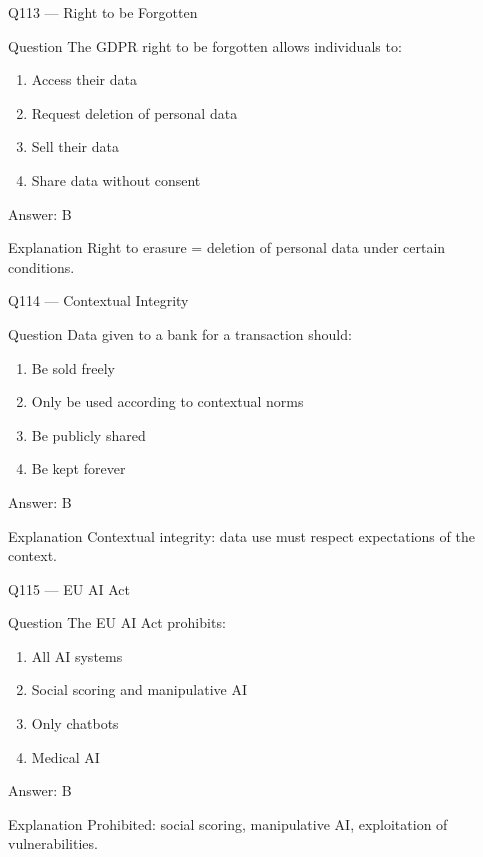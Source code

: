 \documentclass[aspectratio=169,8pt]{beamer}
\begin{document}
	\begin{frame}{Q113 --- Right to be Forgotten}
		\begin{block}{Question}
			The GDPR right to be forgotten allows individuals to:
		\end{block}
		\begin{enumerate}
			\item Access their data
			\item Request deletion of personal data
			\item Sell their data
			\item Share data without consent
		\end{enumerate}
		\begin{exampleblock}{Answer: B}\end{exampleblock}
		\begin{block}{Explanation}
			Right to erasure = deletion of personal data under certain conditions.
		\end{block}
	\end{frame}
	
	\begin{frame}{Q114 --- Contextual Integrity}
		\begin{block}{Question}
			Data given to a bank for a transaction should:
		\end{block}
		\begin{enumerate}
			\item Be sold freely
			\item Only be used according to contextual norms
			\item Be publicly shared
			\item Be kept forever
		\end{enumerate}
		\begin{exampleblock}{Answer: B}\end{exampleblock}
		\begin{block}{Explanation}
			Contextual integrity: data use must respect expectations of the context.
		\end{block}
	\end{frame}
	
	\begin{frame}{Q115 --- EU AI Act}
		\begin{block}{Question}
			The EU AI Act prohibits:
		\end{block}
		\begin{enumerate}
			\item All AI systems
			\item Social scoring and manipulative AI
			\item Only chatbots
			\item Medical AI
		\end{enumerate}
		\begin{exampleblock}{Answer: B}\end{exampleblock}
		\begin{block}{Explanation}
			Prohibited: social scoring, manipulative AI, exploitation of vulnerabilities.
		\end{block}
	\end{frame}
	
\end{document}
